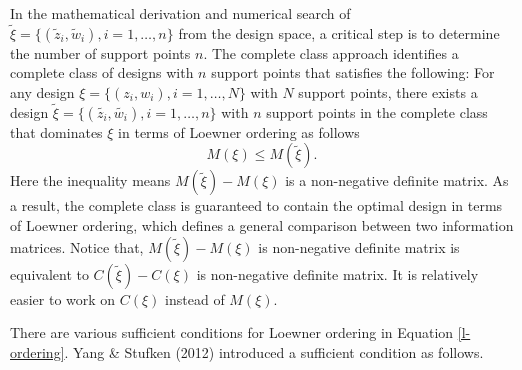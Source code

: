 \documentclass[12pt]{TD-CJS}
\begin{document}
In the mathematical derivation and numerical search of $\tilde{\xi} = \{(\tilde{z}_i,\tilde{w}_i), i=1,\ldots,n\}$ from the design space, a critical step is to determine the number of support points $n$.  The complete class approach identifies a complete class of designs with $n$ support points that satisfies the following: For any design $\xi=\{(z_i,w_i), i=1,\ldots,N\}$ with $N$ support points, there exists a design $\tilde{\xi} = \{(\tilde{z_i},\tilde{w_i}), i=1,\ldots,n\}$ with $n$ support points in the complete class that dominates $\xi$ in terms of Loewner ordering as follows
\begin{equation}\label{l-ordering}
    M(\xi)\le M(\tilde{\xi}).
\end{equation} Here the inequality means $M(\tilde{\xi})-M(\xi)$ is a non-negative definite matrix. As a result, the complete class is guaranteed to contain the optimal design in terms of Loewner ordering, which defines a general comparison between two information matrices. Notice that, $M(\tilde{\xi})-M(\xi)$ is non-negative definite matrix is equivalent to $C(\tilde{\xi})-C(\xi)$ is non-negative definite matrix. It is relatively easier to work on $C(\xi)$ instead of $M(\xi)$.

There are various sufficient conditions for Loewner ordering in Equation \eqref{l-ordering}. Yang \& Stufken (2012) introduced a sufficient condition as follows. 
\end{document}
